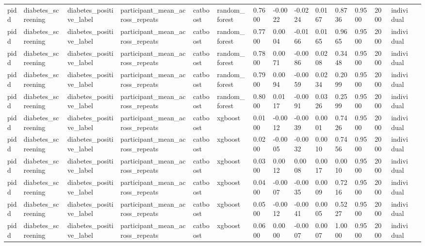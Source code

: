 \begin{tabular}{lllllllllllllll}
pidd & diabetes\_screening & diabetes\_positive\_label & participant\_mean\_across\_repeats & catboost & random\_forest & 0.7600 & -0.0022 & -0.0224 & 0.0167 & 0.8736 & 0.9500 & 2000 & individual &  \\
pidd & diabetes\_screening & diabetes\_positive\_label & participant\_mean\_across\_repeats & catboost & random\_forest & 0.7700 & 0.0004 & -0.0166 & 0.0165 & 0.9665 & 0.9500 & 2000 & individual &  \\
pidd & diabetes\_screening & diabetes\_positive\_label & participant\_mean\_across\_repeats & catboost & random\_forest & 0.7800 & 0.0071 & -0.0086 & 0.0208 & 0.3448 & 0.9500 & 2000 & individual &  \\
pidd & diabetes\_screening & diabetes\_positive\_label & participant\_mean\_across\_repeats & catboost & random\_forest & 0.7900 & 0.0094 & -0.0059 & 0.0234 & 0.2099 & 0.9500 & 2000 & individual &  \\
pidd & diabetes\_screening & diabetes\_positive\_label & participant\_mean\_across\_repeats & catboost & random\_forest & 0.8000 & 0.0117 & -0.0091 & 0.0326 & 0.2599 & 0.9500 & 2000 & individual &  \\
pidd & diabetes\_screening & diabetes\_positive\_label & participant\_mean\_across\_repeats & catboost & xgboost & 0.0100 & -0.0012 & -0.0039 & 0.0001 & 0.7426 & 0.9500 & 2000 & individual &  \\
pidd & diabetes\_screening & diabetes\_positive\_label & participant\_mean\_across\_repeats & catboost & xgboost & 0.0200 & -0.0005 & -0.0032 & 0.0010 & 0.7456 & 0.9500 & 2000 & individual &  \\
pidd & diabetes\_screening & diabetes\_positive\_label & participant\_mean\_across\_repeats & catboost & xgboost & 0.0300 & 0.0012 & 0.0008 & 0.0017 & 0.0010 & 0.9500 & 2000 & individual &  \\
pidd & diabetes\_screening & diabetes\_positive\_label & participant\_mean\_across\_repeats & catboost & xgboost & 0.0400 & -0.0007 & -0.0035 & 0.0009 & 0.7216 & 0.9500 & 2000 & individual &  \\
pidd & diabetes\_screening & diabetes\_positive\_label & participant\_mean\_across\_repeats & catboost & xgboost & 0.0500 & -0.0012 & -0.0041 & 0.0005 & 0.5227 & 0.9500 & 2000 & individual &  \\
pidd & diabetes\_screening & diabetes\_positive\_label & participant\_mean\_across\_repeats & catboost & xgboost & 0.0600 & 0.0000 & -0.0007 & 0.0007 & 1.0000 & 0.9500 & 2000 & individual &  \\

\end{tabular}
